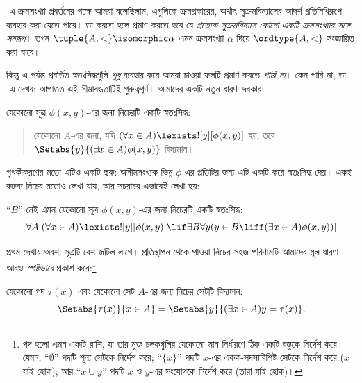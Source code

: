 \documentclass[../../../include/open-logic-section]{subfiles}
\begin{document}

-এ ক্রমসংখ্যা প্রবর্তনের পক্ষে
আমরা বলেছিলাম, এগুলিকে ক্রমপ্রকারের, অর্থাৎ
সুক্রমবিন্যাসের আদর্শ প্রতিনিধিরূপে ব্যবহার করা যেতে পারে।
তা করতে হলে প্রমাণ করতে হবে যে
\emph{প্রত্যেক সুক্রমবিন্যাস কোনো একটি ক্রমসংখ্যার সঙ্গে সমরূপ}।
তখন $\tuple{A, <} \isomorphic \alpha$ এমন ক্রমসংখ্যা
$\alpha$ দিয়ে $\ordtype{A, <}$ সংজ্ঞায়িত করা যাবে।

কিন্তু এ পর্যন্ত প্রবর্তিত স্বতঃসিদ্ধগুলি \emph{শুধু} ব্যবহার করে
আমরা চাওয়া ফলটি প্রমাণ করতে \emph{পারি না}। কেন পারি না,
তা -এ দেখব; আপাতত এই
সীমাবদ্ধতাটিই গুরুত্বপূর্ণ। আমাদের একটি নতুন ধারণা দরকার:

\begin{axiom}[প্রতিস্থাপন ছক]
যেকোনো সূত্র $\phi(x, y)$-এর জন্য নিচেরটি একটি স্বতঃসিদ্ধ:
\begin{quote}
	যেকোনো $A$-এর জন্য, যদি $(\forall x \in A)\lexists![y][\phi(x,y)]$ হয়,
	তবে $\Setabs{y}{(\exists x \in A)\phi(x,y)}$ বিদ্যমান।
\end{quote}
\end{axiom}
\noindent
পৃথকীকরণের মতো এটিও একটি ছক: অসীমসংখ্যক ভিন্ন $\phi$-এর
প্রতিটির জন্য এটি একটি করে স্বতঃসিদ্ধ দেয়। একই বক্তব্য
নিচের মতোও লেখা যায়, আর সচরাচর এভাবেই লেখা হয়:

\begin{defish}
``$B$'' নেই এমন যেকোনো সূত্র $\phi(x,y)$-এর জন্য নিচেরটি একটি স্বতঃসিদ্ধ:
\[
\forall A[(\forall x \in A)\lexists![y][\phi(x,y)] \lif \exists B\forall y (y \in B \liff (\exists x \in A)\phi(x,y))]
\]
\end{defish}

প্রথম দেখায় অবশ্য সূত্রটি বেশ জটিল লাগে। প্রতিস্থাপন থেকে
পাওয়া নিচের সহজ পরিণামটি আমাদের মূল ধারণা আরও
\emph{স্পষ্টভাবে} প্রকাশ করে:\footnote{পদ হলো এমন একটি রাশি, যা
তার মুক্ত চলকগুলির যেকোনো মান নির্ধারণে ঠিক একটি বস্তুকে নির্দেশ
করে। যেমন, ``$\emptyset$'' পদটি শূন্য সেটকে নির্দেশ করে;
``$\{x\}$'' পদটি $x$-এর একক-সদস্যবিশিষ্ট সেটকে নির্দেশ করে
($x$ যাই হোক); আর ``$x \cup y$'' পদটি $x$ ও $y$-এর
সংযোগকে নির্দেশ করে (তারা যাই হোক)।}

\begin{cor}
যেকোনো পদ $\tau(x)$ এবং যেকোনো সেট $A$-এর জন্য
নিচের সেটটি বিদ্যমান:
\[
	\Setabs{\tau(x)}{x \in A} = \Setabs{y}{(\exists x \in A)y = \tau(x)}.
\]
\end{cor}
\end{document}
